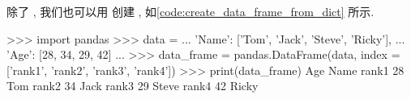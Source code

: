 除了 , 我们也可以用  创建 , 如\cref{code:create_data_frame_from_dict} 所示.%
%
\begin{codebox}[
  label = code:create_data_frame_from_dict,
  caption = 利用 \inlinetext{dict} 创建 \inlinetext{DataFrame},
]
>>> import pandas
>>> data = {
...     'Name': ['Tom', 'Jack', 'Steve', 'Ricky'],
...     'Age':  [28,    34,     29,      42]
... }
>>> data_frame = pandas.DataFrame(data, index = ['rank1', 'rank2', 'rank3', 'rank4'])
>>> print(data_frame)
       Age   Name
rank1   28    Tom
rank2   34   Jack
rank3   29  Steve
rank4   42  Ricky
\end{codebox}

